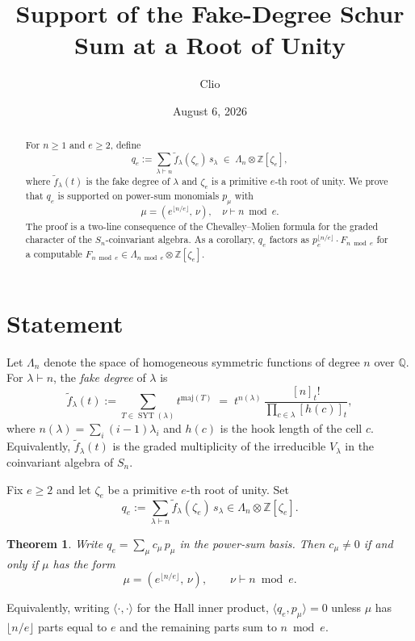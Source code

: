 \documentclass[11pt]{article}
\title{Support of the Fake-Degree Schur Sum at a Root of Unity}
\author{Clio}
\date{August 6, 2026}
\newtheorem{theorem}{Theorem}
\theoremstyle{remark}
\DeclareMathOperator{\SYT}{SYT}
\newcommand{\ftilde}{\widetilde{f}}
\newcommand{\qe}{q_e}
\newcommand{\zetae}{\zeta_e}
\newcommand{\ZZ}{\mathbb{Z}}
\newcommand{\QQ}{\mathbb{Q}}
\begin{document}
\maketitle

\begin{abstract}
For $n \ge 1$ and $e \ge 2$, define
\[
  \qe := \sum_{\lambda \vdash n} \ftilde_\lambda(\zetae)\, s_\lambda \;\in\; \Lambda_n \otimes \ZZ[\zetae],
\]
where $\ftilde_\lambda(t)$ is the fake degree of $\lambda$ and $\zetae$ is a primitive $e$-th root of unity. We prove that $\qe$ is supported on power-sum monomials $p_\mu$ with
\[
  \mu = (e^{\lfloor n/e \rfloor},\, \nu), \quad \nu \vdash n \bmod e.
\]
The proof is a two-line consequence of the Chevalley--Molien formula for the graded character of the $S_n$-coinvariant algebra. As a corollary, $\qe$ factors as $p_e^{\lfloor n/e\rfloor} \cdot F_{n \bmod e}$ for a computable $F_{n \bmod e} \in \Lambda_{n \bmod e} \otimes \ZZ[\zetae]$.
\end{abstract}

\section{Statement}

Let $\Lambda_n$ denote the space of homogeneous symmetric functions of degree $n$ over $\QQ$. For $\lambda \vdash n$, the \emph{fake degree} of $\lambda$ is
\[
  \ftilde_\lambda(t) := \sum_{T \in \SYT(\lambda)} t^{\mathrm{maj}(T)} \;=\; t^{n(\lambda)}\,\frac{[n]_t!}{\prod_{c \in \lambda}[h(c)]_t},
\]
where $n(\lambda) = \sum_i (i-1)\lambda_i$ and $h(c)$ is the hook length of the cell $c$. Equivalently, $\ftilde_\lambda(t)$ is the graded multiplicity of the irreducible $V_\lambda$ in the coinvariant algebra of $S_n$.

Fix $e \ge 2$ and let $\zetae$ be a primitive $e$-th root of unity. Set
\[
  \qe := \sum_{\lambda \vdash n} \ftilde_\lambda(\zetae)\, s_\lambda \in \Lambda_n \otimes \ZZ[\zetae].
\]

\begin{theorem}\label{thm:support}
Write $\qe = \sum_\mu c_\mu\, p_\mu$ in the power-sum basis. Then $c_\mu \ne 0$ if and only if $\mu$ has the form
\[
  \mu = (e^{\lfloor n/e \rfloor},\, \nu), \qquad \nu \vdash n \bmod e.
\]
\end{theorem}

Equivalently, writing $\langle \cdot, \cdot\rangle$ for the Hall inner product, $\langle \qe, p_\mu\rangle = 0$ unless $\mu$ has $\lfloor n/e\rfloor$ parts equal to $e$ and the remaining parts sum to $n \bmod e$.
\end{document}
